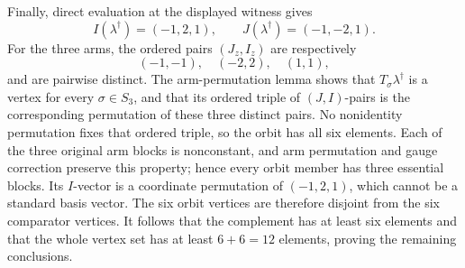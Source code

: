 Finally, direct evaluation at the displayed witness gives
\[I(\lambda^\dagger)=(-1,2,1),\qquad J(\lambda^\dagger)=(-1,-2,1).\]
For the three arms, the ordered pairs \((J_z,I_z)\) are respectively
\[(-1,-1),\quad(-2,2),\quad(1,1),\]
and are pairwise distinct. The arm-permutation lemma shows that \(T_\sigma\lambda^\dagger\) is a vertex for every \(\sigma\in S_3\), and that its ordered triple of \((J,I)\)-pairs is the corresponding permutation of these three distinct pairs. No nonidentity permutation fixes that ordered triple, so the orbit has all six elements. Each of the three original arm blocks is nonconstant, and arm permutation and gauge correction preserve this property; hence every orbit member has three essential blocks. Its \(I\)-vector is a coordinate permutation of \((-1,2,1)\), which cannot be a standard basis vector. The six orbit vertices are therefore disjoint from the six comparator vertices. It follows that the complement has at least six elements and that the whole vertex set has at least \(6+6=12\) elements, proving the remaining conclusions.